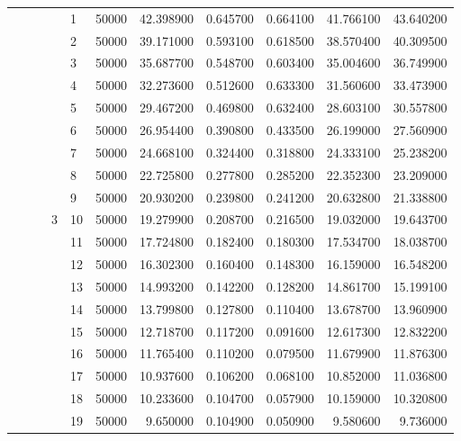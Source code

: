 \begin{tabular}{llllllrrrrr}
 &  &  & \multirow[t]{25}{*}{3} & 1 & 50000 & 42.398900 & 0.645700 & 0.664100 & 41.766100 & 43.640200 \\
\cline{5-11}
 &  &  &  & 2 & 50000 & 39.171000 & 0.593100 & 0.618500 & 38.570400 & 40.309500 \\
\cline{5-11}
 &  &  &  & 3 & 50000 & 35.687700 & 0.548700 & 0.603400 & 35.004600 & 36.749900 \\
\cline{5-11}
 &  &  &  & 4 & 50000 & 32.273600 & 0.512600 & 0.633300 & 31.560600 & 33.473900 \\
\cline{5-11}
 &  &  &  & 5 & 50000 & 29.467200 & 0.469800 & 0.632400 & 28.603100 & 30.557800 \\
\cline{5-11}
 &  &  &  & 6 & 50000 & 26.954400 & 0.390800 & 0.433500 & 26.199000 & 27.560900 \\
\cline{5-11}
 &  &  &  & 7 & 50000 & 24.668100 & 0.324400 & 0.318800 & 24.333100 & 25.238200 \\
\cline{5-11}
 &  &  &  & 8 & 50000 & 22.725800 & 0.277800 & 0.285200 & 22.352300 & 23.209000 \\
\cline{5-11}
 &  &  &  & 9 & 50000 & 20.930200 & 0.239800 & 0.241200 & 20.632800 & 21.338800 \\
\cline{5-11}
 &  &  &  & 10 & 50000 & 19.279900 & 0.208700 & 0.216500 & 19.032000 & 19.643700 \\
\cline{5-11}
 &  &  &  & 11 & 50000 & 17.724800 & 0.182400 & 0.180300 & 17.534700 & 18.038700 \\
\cline{5-11}
 &  &  &  & 12 & 50000 & 16.302300 & 0.160400 & 0.148300 & 16.159000 & 16.548200 \\
\cline{5-11}
 &  &  &  & 13 & 50000 & 14.993200 & 0.142200 & 0.128200 & 14.861700 & 15.199100 \\
\cline{5-11}
 &  &  &  & 14 & 50000 & 13.799800 & 0.127800 & 0.110400 & 13.678700 & 13.960900 \\
\cline{5-11}
 &  &  &  & 15 & 50000 & 12.718700 & 0.117200 & 0.091600 & 12.617300 & 12.832200 \\
\cline{5-11}
 &  &  &  & 16 & 50000 & 11.765400 & 0.110200 & 0.079500 & 11.679900 & 11.876300 \\
\cline{5-11}
 &  &  &  & 17 & 50000 & 10.937600 & 0.106200 & 0.068100 & 10.852000 & 11.036800 \\
\cline{5-11}
 &  &  &  & 18 & 50000 & 10.233600 & 0.104700 & 0.057900 & 10.159000 & 10.320800 \\
\cline{5-11}
 &  &  &  & 19 & 50000 & 9.650000 & 0.104900 & 0.050900 & 9.580600 & 9.736000 \\

\end{tabular}
